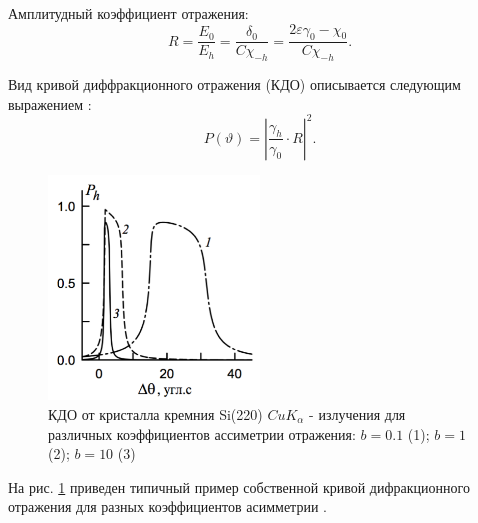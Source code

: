 Амплитудный коэффициент отражения:
\begin{equation}
    R = \frac{E_0}{E_h} = \frac{\delta_0}{C\chi_{-h}} = \frac{2\varepsilon\gamma_0-\chi_0}{C\chi_{-h}}.
\end{equation}

Вид кривой диффракционного отражения (КДО) описывается следующим выражением \cite{Bushuev_Oreshko_2002}:
\begin{equation}
    \label{eq:KDO_self}
    P (\vartheta) =  |\frac{\gamma_h}{\gamma_0} \cdot R|^2.
\end{equation}

\begin{figure}[H]
  \centering
  \includegraphics[width=0.5\textwidth]{images/typical_rocking_curve.png}
  \caption{КДО от кристалла кремния Si(220) $CuK_{\alpha}$ - излучения для различных коэффициентов ассиметрии
  отражения: $b = 0.1$ (1); $b = 1$ (2); $b = 10$ (3)}
  \label{ris:typical_rocking_curve}
\end{figure}

На рис. \ref{ris:typical_rocking_curve} приведен типичный пример собственной кривой дифракционного отражения
для разных коэффициентов асимметрии \cite{Bushuev_Oreshko_2002}.
